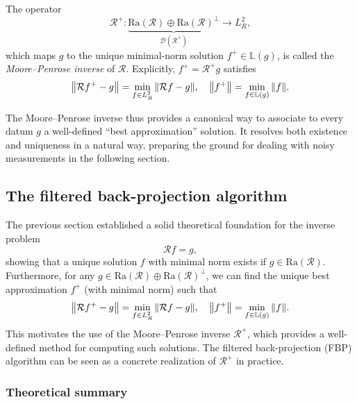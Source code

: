 \documentclass[12pt,a4paper]{article}
\begin{document}
\begin{definition}
    The operator
    \[
        \mathcal{R}^+ : 
        \underbrace{\mathrm{Ra}(\mathcal{R}) \oplus \mathrm{Ra}(\mathcal{R})^\perp}_{\mathcal{D}(\mathcal{R}^+)}
        \longrightarrow L^2_R,
    \]
    which maps $g$ to the unique minimal-norm solution $f^+ \in \mathbb{L}(g)$, is called the \emph{Moore--Penrose inverse} of $\mathcal{R}$.  
    Explicitly, $f^+ = \mathcal{R}^+ g$ satisfies
    \[
        \norm{\mathcal{R}f^+ - g} 
        = \min_{f \in L^2_R} \norm{\mathcal{R}f - g}, 
        \quad 
        \norm{f^+} = \min_{f \in \mathbb{L}(g)} \norm{f}.
    \]
\end{definition}

\medskip

The Moore--Penrose inverse thus provides a canonical way to associate to every datum $g$ a well-defined ``best approximation'' solution. It resolves both existence and uniqueness in a natural way, preparing the ground for dealing with noisy measurements in the following section.

\subsection{The filtered back-projection algorithm}
\label{subsec:fbp}

The previous section established a solid theoretical foundation for the inverse problem
\[
    \mathcal{R} f = g,
\]
showing that a unique solution $f$ with minimal norm exists if $g \in \mathrm{Ra}(\mathcal{R})$. Furthermore, for any $g \in \mathrm{Ra}(\mathcal{R}) \oplus \mathrm{Ra}(\mathcal{R})^\perp$, we can find the unique best approximation $f^+$ (with minimal norm) such that
\[
    \norm{\mathcal{R} f^+ - g} = \min_{f \in L^2_R} \norm{\mathcal{R} f - g}, \quad 
    \norm{f^+} = \min_{f \in \mathbb{L}(g)} \norm{f}.
\]
This motivates the use of the Moore--Penrose inverse $\mathcal{R}^+$, which provides a well-defined method for computing such solutions. The filtered back-projection (FBP) algorithm can be seen as a concrete realization of $\mathcal{R}^+$ in practice.

\subsubsection{Theoretical summary}
\end{document}
